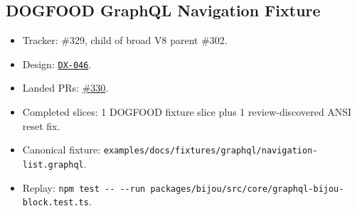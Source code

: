 \subsection{DOGFOOD GraphQL Navigation Fixture}\label{record-260-dogfood-graphql-navigation-fixture}

\begin{itemize}
\tightlist
\item
  Tracker: \#329, child of broad V8 parent \#302.
\item
  Design: \href{https://github.com/flyingrobots/bijou/blob/cbd70612140e7a450d764b3c7be1c6af878b99bc/docs/design/DX-046-graphql-authored-dogfood-block-fixture.md}{\texttt{D\allowbreak{}X\allowbreak{}-\allowbreak{}0\allowbreak{}4\allowbreak{}6}}.
\item
  Landed PRs: \href{https://github.com/flyingrobots/bijou/pull/330}{\#330}.
\item
  Completed slices: 1 DOGFOOD fixture slice plus 1 review-discovered ANSI reset fix.
\item
  Canonical fixture: \texttt{e\allowbreak{}x\allowbreak{}a\allowbreak{}m\allowbreak{}p\allowbreak{}l\allowbreak{}e\allowbreak{}s\allowbreak{}/\allowbreak{}d\allowbreak{}o\allowbreak{}c\allowbreak{}s\allowbreak{}/\allowbreak{}f\allowbreak{}i\allowbreak{}x\allowbreak{}t\allowbreak{}u\allowbreak{}r\allowbreak{}e\allowbreak{}s\allowbreak{}/\allowbreak{}g\allowbreak{}r\allowbreak{}a\allowbreak{}p\allowbreak{}h\allowbreak{}q\allowbreak{}l\allowbreak{}/\allowbreak{}n\allowbreak{}a\allowbreak{}v\allowbreak{}i\allowbreak{}g\allowbreak{}a\allowbreak{}t\allowbreak{}i\allowbreak{}o\allowbreak{}n\allowbreak{}-\allowbreak{}l\allowbreak{}i\allowbreak{}s\allowbreak{}t\allowbreak{}.\allowbreak{}g\allowbreak{}r\allowbreak{}a\allowbreak{}p\allowbreak{}h\allowbreak{}q\allowbreak{}l}.
\item
  Replay: \texttt{n\allowbreak{}p\allowbreak{}m\allowbreak{} \allowbreak{}t\allowbreak{}e\allowbreak{}s\allowbreak{}t\allowbreak{} \allowbreak{}-\allowbreak{}-\allowbreak{} \allowbreak{}-\allowbreak{}-\allowbreak{}r\allowbreak{}u\allowbreak{}n\allowbreak{} \allowbreak{}p\allowbreak{}a\allowbreak{}c\allowbreak{}k\allowbreak{}a\allowbreak{}g\allowbreak{}e\allowbreak{}s\allowbreak{}/\allowbreak{}b\allowbreak{}i\allowbreak{}j\allowbreak{}o\allowbreak{}u\allowbreak{}/\allowbreak{}s\allowbreak{}r\allowbreak{}c\allowbreak{}/\allowbreak{}c\allowbreak{}o\allowbreak{}r\allowbreak{}e\allowbreak{}/\allowbreak{}g\allowbreak{}r\allowbreak{}a\allowbreak{}p\allowbreak{}h\allowbreak{}q\allowbreak{}l\allowbreak{}-\allowbreak{}b\allowbreak{}i\allowbreak{}j\allowbreak{}o\allowbreak{}u\allowbreak{}-\allowbreak{}b\allowbreak{}l\allowbreak{}o\allowbreak{}c\allowbreak{}k\allowbreak{}.\allowbreak{}t\allowbreak{}e\allowbreak{}s\allowbreak{}t\allowbreak{}.\allowbreak{}t\allowbreak{}s}.

\end{itemize}
